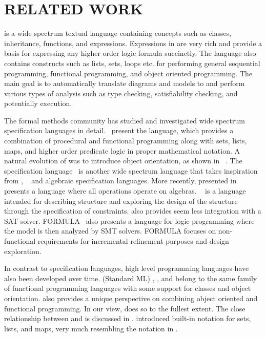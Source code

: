 \section{RELATED WORK}
\label{sec:related-work}

\Klang{} is a wide spectrum textual language containing concepts such
as classes, inheritance, functions, and expressions. Expressions in
\Klang{} are very rich and provide a basis for expressing any higher
order logic formula succinctly. The language also contains constructs
such as lists, sets, loops etc. for performing general sequential
programming, functional programming, and object oriented
programming. The main goal is to automatically translate \sysml{}
diagrams and models to \Klang{} and perform various types of analysis
such as type checking, satisfiability checking, and potentially
execution.

The formal methods community has studied and investigated wide
spectrum specification languages in
detail.~\cite{vdm78,bjoerner-jones-82,jones90,jones-shaw-90} present
the \vdm{} language, which provides a combination of procedural and
functional programming along with sets, lists, maps, and higher order
predicate logic in proper mathematical notation. A natural evolution
of \vdm{} was to introduce object orientation, as shown in
\vdmpp{}~\cite{vdmplusplus05}. The \raiselang{} specification
language~\cite{raise92} is another wide spectrum language that takes
inspiration from \vdm{}, \zlang{}~\cite{spivey-Z-1988} and algebraic
specification languages. More recently, \asml{} presented
in~\cite{asml05} presents a language where all operations operate on
algebras. \alloy{}~\cite{jackson-alloy-12} is a language intended for
describing structure and exploring the design of the structure through
the specification of constraints. \alloy{} also provides seem less
integration with a SAT solver. FORMULA~\cite{jackson2009specifying}
also presents a language for logic programming where the model is then
analyzed by SMT solvers. FORMULA focuses on non-functional
requirements for incremental refinement purposes and design
exploration. 

In contrast to specification languages, high level programming
languages have also been developed over time. \sml{} (Standard ML)
\cite{standard-ml-97}, \ocaml{} \cite{ocaml}, and \haskell{}
\cite{jones2003haskell} belong to the same family of functional
programming languages with some support for classes and object
orientation. \python{} \cite{python} also provides a unique
perspective on combining object oriented and functional
programming. In our view, \scala{} \cite{scala} does so to the fullest
extent. The close relationship between \scala{} and \vdm{} is
discussed in \cite{havelund-scala-vdm-12}.  \fortress{}
\cite{fortress} introduced built-in notation for sets, lists, and
maps, very much resembling the notation in \vdm{}.

